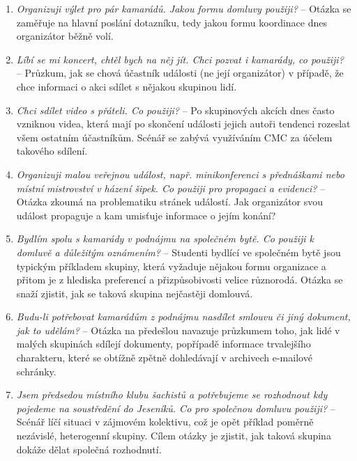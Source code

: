 \documentclass[12pt,oneside,final]{fithesis2}
\begin{document}
\begin{enumerate}
    \item \emph{Organizuji výlet pro pár kamarádů. Jakou formu domluvy použiji?} --
        Otázka se zaměřuje na hlavní poslání dotazníku, tedy jakou formu koordinace dnes organizátor běžně volí.

    \item \emph{Líbí se mi koncert, chtěl bych na něj jít. Chci pozvat i kamarády, co použiji?} --
        Průzkum, jak se chová účastník události (ne její organizátor) v případě, že chce informaci o akci sdílet s nějakou skupinou lidí.

    \item \emph{Chci sdílet video s přáteli. Co použiji?} --
        Po skupinových akcích dnes často vzniknou videa, která mají po skončení události jejich autoři tendenci rozeslat všem ostatním účastníkům. Scénář se zabývá využíváním CMC za účelem takového sdílení.

    \item \emph{Organizuji malou veřejnou událost, např. minikonferenci s přednáškami nebo místní mistrovství v házení šipek. Co použiji pro propagaci a evidenci?} --
        Otázka zkoumá na problematiku stránek událostí. Jak organizátor svou událost propaguje a kam umisťuje informace o jejím konání?

    \item \emph{Bydlím spolu s kamarády v podnájmu na společném bytě. Co použiji k domluvě a důležitým oznámením?} --
        Studenti bydlící ve společném bytě jsou typickým příkladem skupiny, která vyžaduje nějakou formu organizace a přitom je z hlediska preferencí a přizpůsobivosti velice různorodá. Otázka se snaží zjistit, jak se taková skupina nejčastěji domlouvá.

    \item \emph{Budu-li potřebovat kamarádům z podnájmu nasdílet smlouvu či jiný dokument, jak to udělám?} --
        Otázka na předešlou navazuje průzkumem toho, jak lidé v malých skupinách sdílejí dokumenty, popřípadě informace trvalejšího charakteru, které se obtížně zpětně dohledávají v archivech e-mailové schránky.

    \item \emph{Jsem předsedou místního klubu šachistů a potřebujeme se rozhodnout kdy pojedeme na soustředění do Jeseníků. Co pro společnou domluvu použiji?} --
        Scénář líčí situaci v zájmovém kolektivu, což je opět příklad poměrně nezávislé, heterogenní skupiny. Cílem otázky je zjistit, jak taková skupina dokáže dělat společná rozhodnutí.


\end{enumerate}
\end{document}
